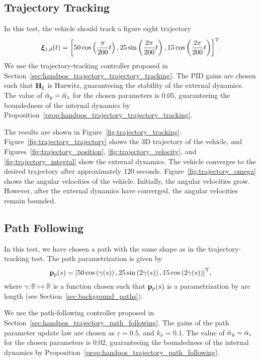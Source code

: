 \subsection{Trajectory Tracking}
In this test, the vehicle should track a figure eight trajectory
\begin{equation}
    \bm{\xi}_{1, d}(t) = \left[50\cos\left(\frac{\pi}{200}t\right), 25\sin\left(\frac{2\pi}{200}t\right), 15\cos\left(\frac{2\pi}{200}t\right)\right]^{\mathrm{T}}\!\!.
\end{equation}
We use the trajectory-tracking controller proposed in Section~\ref{sec:handpos_trajectory_trajectory_tracking}.
The PID gains are chosen such that $\mathbf{H}_{\xi}$ is Hurwitz, guaranteeing the stability of the external dynamics.
The value of $\Bar{\alpha}_y = \Bar{\alpha}_z$ for the chosen parameters is $0.05$, guaranteeing the boundedness of the internal dynamics by Proposition~\ref{prop:handpos_trajectory_trajectory_tracking}.

The results are shown in Figure~\ref{fig:trajectory_tracking}.
Figure~\ref{fig:trajectory_trajectory} shows the 3D trajectory of the vehicle, and Figures~\ref{fig:trajectory_position}, \ref{fig:trajectory_velocity}, and \ref{fig:trajectory_integral} show the external dynamics.
The vehicle converges to the desired trajectory after approximately $120$ seconds.
Figure~\ref{fig:trajectory_omega} shows the angular velocities of the vehicle.
Initially, the angular velocities grow.
However, after the external dynamics have converged, the angular velocities remain bounded.

\subsection{Path Following}


In this test, we have chosen a path with the same shape as in the trajectory-tracking test.
The path parametrization is given by
\begin{equation}
    \mathbf{p}_p(s) = \left[50\cos\left(\gamma(s)\right), 25\sin\left(2\gamma(s)\right), 15\cos\left(2\gamma(s)\right)\right]^{\mathrm{T}}\!,
\end{equation}
where $\gamma: \mathbb{R} \mapsto \mathbb{R}$ is a function chosen such that $\mathbf{p}_p(s)$ is a parametrization by arc length (see Section~\ref{sec:background_paths}).

We use the path-following controller proposed in Section~\ref{sec:handpos_trajectory_path_following}.
The gains of the path parameter update law are chosen as $\varepsilon = 0.5$, and $k_{\sigma} = 0.1$.
The value of $\Bar{\alpha}_y = \Bar{\alpha}_z$ for the chosen parameters is $0.02$, guaranteeing the boundedness of the internal dynamics by Proposition~\ref{prop:handpos_trajectory_path_following}.

